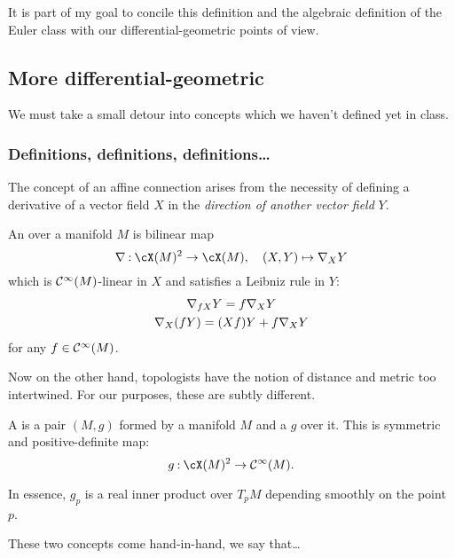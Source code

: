 \documentclass[12pt]{memoir}
\begin{document}
It is part of my goal to concile this definition and the algebraic definition of the Euler class with our differential-geometric points of view.

\subsection{More differential-geometric}
We must take a small detour into concepts which we haven't defined yet in class.

\subsubsection{Definitions, definitions, definitions\dots}

The concept of an affine connection arises from the necessity of defining a derivative of a vector field $X$ in the \emph{direction of another vector field} $Y$.

\begin{Def}
    An  over a manifold $M$ is bilinear map 
    $$\nbf\:\cX(M)^2\to\cX(M),\quad (X,Y)\mapsto \nbf_XY$$
    which is $\mathcal{C}^\infty(M)$-linear in $X$ and satisfies a Leibniz rule in $Y$:
    \begin{gather*}
        {\mathbf{\nabla}}_{fX}Y=f{\mathbf{\nabla}}_XY\\
        {\mathbf{\nabla}}_{X}(fY)=(Xf)Y+f\nabla_XY\\
    \end{gather*}
    for any $f\in\mathcal{C}^\infty(M)$.
\end{Def}

Now on the other hand, topologists have the notion of distance and metric too intertwined. For our purposes, these are subtly different.

\begin{Def}
    A  is a pair $(M,g)$ formed by a manifold $M$ and a  $g$ over it. This is symmetric and positive-definite map:
    $$g\:\cX(M)^2\to\Coo(M).$$
\end{Def}

\begin{Rmk}
    In essence, $g_p$ is a real inner product over $T_pM$ depending smoothly on the point $p$.    
\end{Rmk}

These two concepts come hand-in-hand, we say that\dots
\end{document}
